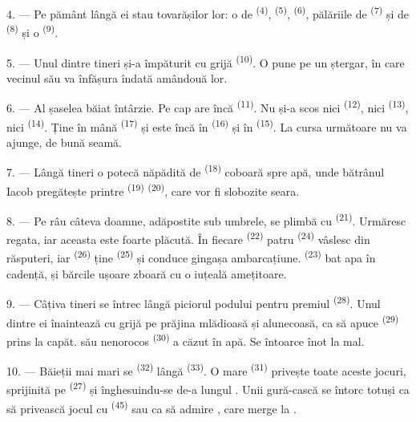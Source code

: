 4. --- Pe pământ lângă ei stau  tovarășilor lor: o
 de  \textsuperscript{(4)}, 
\textsuperscript{(5)},  \textsuperscript{(6)}, pălăriile de
 \textsuperscript{(7)} și de  \textsuperscript{(8)} și
o  \textsuperscript{(9)}.

5. --- Unul dintre tineri și-a împăturit cu grijă 
\textsuperscript{(10)}. O pune pe un ștergar, în care vecinul său va înfășura
îndată amândouă  lor.

6. --- Al șaselea băiat întârzie. Pe cap are încă 
\textsuperscript{(11)}. Nu și-a scos nici  \textsuperscript{(12)},
nici  \textsuperscript{(13)}, nici 
\textsuperscript{(14)}. Ține în mână  \textsuperscript{(17)} și este
încă în  \textsuperscript{(16)} și în 
\textsuperscript{(15)}. La cursa următoare nu va ajunge, de bună seamă.

7. --- Lângă tineri o potecă năpădită de  \textsuperscript{(18)}
coboară spre apă, unde bătrânul Iacob pregătește printre 
\textsuperscript{(19)}  \textsuperscript{(20)}, care
vor fi slobozite seara.

\VUsaut{4.4mm}
\VUsaut{3.4mm}

8. --- Pe râu câteva doamne, adăpostite sub umbrele, se plimbă cu 
\textsuperscript{(21)}. Urmăresc regata, iar aceasta este foarte plăcută. În
fiecare  \textsuperscript{(22)} patru 
\textsuperscript{(24)} vâslesc din răsputeri, iar 
\textsuperscript{(26)} ține  \textsuperscript{(25)} și conduce
gingașa ambarcațiune.  \textsuperscript{(23)} bat apa în cadență,
și bărcile ușoare zboară cu o iuțeală amețitoare.

9. --- Câțiva tineri se întrec lângă piciorul podului pentru premiul
 \textsuperscript{(28)}. Unul dintre ei înaintează cu
grijă pe prăjina mlădioasă și alunecoasă, ca să apuce 
\textsuperscript{(29)} prins la capăt.  său nenorocos
\textsuperscript{(30)} a căzut în apă. Se întoarce înot la mal.

10. --- Băieții mai mari se  \textsuperscript{(32)} lângă
 \textsuperscript{(33)}. O  mare
\textsuperscript{(31)} privește toate aceste jocuri, sprijinită pe
  \textsuperscript{(27)} și înghesuindu-se
de-a lungul . Unii gură-cască se întorc totuși ca să privească
jocul cu  \textsuperscript{(45)} sau ca să admire , care merge la .

